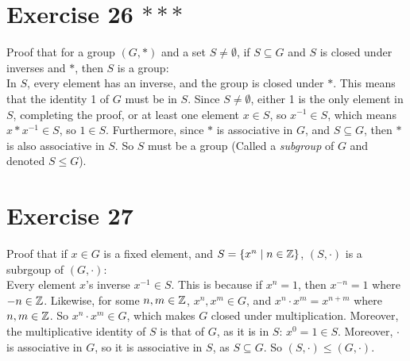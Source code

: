 \documentclass[12pt]{article}
\begin{document}
    \section*{Exercise 26 $***$}
    Proof that for a group $(G, \ast)$ and a set $S \neq \emptyset$,
    if $S \subseteq G$ and $S$ is closed under inverses and $\ast$,
    then $S$ is a group: \\
    In $S$, every element has an inverse,
    and the group is closed under $\ast$.
    This means that the identity 1 of $G$ must be in $S$.
    Since $S \neq \emptyset$,
    either 1 is the only element in $S$, completing the proof,
    or at least one element $x \in S$,
    so $x^{-1} \in S$,
    which means $x \ast x^{-1} \in S$,
    so $1 \in S$.
    Furthermore, since $\ast$ is associative in $G$,
    and $S \subseteq G$,
    then $\ast$ is also associative in $S$.
    So $S$ must be a group
    (Called a \textit{subgroup} of $G$ and denoted $S \leqslant G$).


    \section*{Exercise 27}
    Proof that if $x \in G$ is a fixed element,
    and $S = \{x^n \mid n \in \mathbb{Z}\}$,
    $(S, \cdot)$ is a subrgoup of $(G, \cdot)$: \\
    Every element $x$'s inverse $x^{-1} \in S$.
    This is because if $x^n = 1$,
    then $x^{-n} = 1$ where $-n \in \mathbb{Z}$.
    Likewise, for some $n, m \in \mathbb{Z}$, $x^n, x^m \in G$,
    and $x^n \cdot x^m = x^{n+m}$ where $n, m \in \mathbb{Z}$.
    So $x^n \cdot x^m \in G$, which makes $G$ closed under multiplication. 
    Moreover, the multiplicative identity of $S$ is that of $G$,
    as it is in $S$: $x^0 = 1 \in S$.
    Moreover, $\cdot$ is associative in $G$,
    so it is associative in $S$, as $S \subseteq G$.
    So $(S, \cdot) \leqslant (G, \cdot)$.
\end{document}
